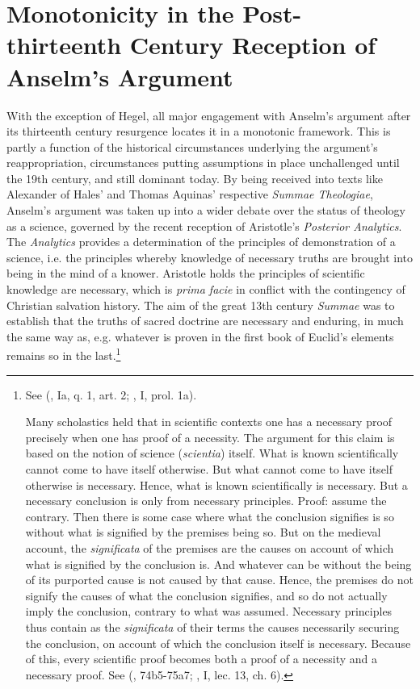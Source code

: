 \documentclass[]{birkjour}
\begin{document}
\section{Monotonicity in the Post-thirteenth Century Reception of Anselm's Argument}
With the exception of Hegel, all major engagement with Anselm's argument after its thirteenth century resurgence locates it in a monotonic framework. This is partly a function of the historical circumstances underlying the argument's reappropriation, circumstances putting assumptions in place unchallenged until the 19th century, and still dominant today. By being received into texts like Alexander of Hales' and Thomas Aquinas' respective \textit{Summae Theologiae}, Anselm's argument was taken up into a wider debate over the status of theology as a science, governed by the recent reception of Aristotle's \textit{Posterior Analytics}. The \textit{Analytics} provides a determination of the principles of demonstration of a science, i.e. the principles whereby knowledge of necessary truths are brought into being in the mind of a knower. Aristotle holds the principles of scientific knowledge are necessary, which is \textit{prima facie} in conflict with the contingency of Christian salvation history. The aim of the great 13th century \textit{Summae} was to establish that the truths of sacred doctrine are necessary and enduring, in much the same way as, e.g. whatever is proven in the first book of Euclid's elements remains so in the last.\footnote{See (\cite{AquinasST}, Ia, q. 1, art. 2; \cite{ScotusOrd}, I, prol. 1a).
		
Many scholastics held that in scientific contexts one has a necessary proof precisely when one has proof of a necessity. The argument for this claim is based on the notion of science (\textit{scientia}) itself. What is known scientifically cannot come to have itself otherwise. But what cannot come to have itself otherwise is necessary. Hence, what is known scientifically is necessary. But a necessary conclusion is only from necessary principles. Proof: assume the contrary. Then there is some case where what the conclusion signifies is so without what is signified by the premises being so. But on the medieval account, the \textit{significata} of the premises are the causes on account of which what is signified by the conclusion is. And whatever can be without the being of its purported cause is not caused by that cause. Hence, the premises do not signify the causes of what the conclusion signifies, and so do not actually imply the conclusion, contrary to what was assumed. Necessary principles thus contain as the \textit{significata} of their terms the causes necessarily securing the conclusion, on account of which the conclusion itself is necessary. Because of this, every scientific proof becomes both a proof of a necessity and a necessary proof. See (\cite{Post.An}, 74b5-75a7; \cite{AquinasPA}, I, lec. 13, ch. 6).}
	
\end{document}
